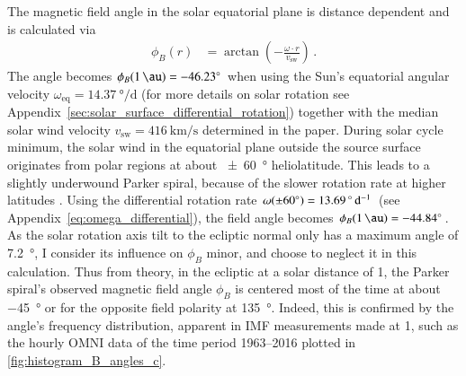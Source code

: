 The magnetic field angle in the solar equatorial plane is distance dependent and is calculated via
\begin{align}
	\phi_B(r) &= \arctan\left(-\frac{\omega \cdot r}{v_\text{sw}}\right)	\,.
\end{align}
The angle becomes $\phi_B(\SI{1}{\au}) = \SI{-46.23}{\degree}$ when using the Sun's equatorial angular velocity $\omega_\text{eq} = \SI{14.37}{\degree\per\day}$ (for more details on solar rotation see Appendix~\ref{sec:solar_surface_differential_rotation}) together with the median solar wind velocity $v_\text{sw} = \SI{416}{\km\per\s}$ determined in the paper. During solar cycle minimum, the solar wind in the equatorial plane outside the source surface originates from polar regions at about \SI{+-60}{\degree} heliolatitude. This leads to a slightly underwound Parker spiral, because of the slower rotation rate at higher latitudes \citep{Banaszkiewicz1998}. Using the differential rotation rate $\omega(\SI{+-60}{\degree}) = \SI{13.69}{\degree\per\day}$ (see Appendix~\ref{eq:omega_differential}), the field angle becomes $\phi_B(\SI{1}{\au}) = \SI{-44.84}{\degree}$. As the solar rotation axis tilt to the ecliptic normal only has a maximum angle of \SI{7.2}{\degree}, I consider its influence on $\phi_B$ minor, and choose to neglect it in this calculation. Thus from theory, in the ecliptic at a solar distance of \SI{1}{\au}, the Parker spiral's observed magnetic field angle $\phi_B$ is centered most of the time at about \SI{-45}{\degree} or for the opposite field polarity at \SI{135}{\degree}. Indeed, this is confirmed by the angle's frequency distribution, apparent in IMF measurements made at \SI{1}{\au}, such as the hourly OMNI data of the time period 1963--2016 plotted in \autoref{fig:histogram_B_angles_c}.
\begin{figure}[htb]
\end{figure}

